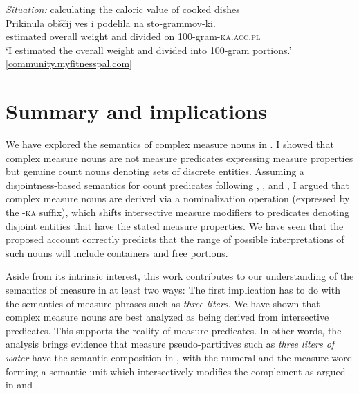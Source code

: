 \documentclass[output=paper]{langscibook}
\begin{document}
\ea\label{ex:khrizmann:40} \textit{Situation:} calculating the caloric value of cooked dishes\\
\gll Prikinula obščij ves i podelila na sto-grammov-ki.\\
estimated overall weight and divided on 100-gram-\textsc{ka.acc.pl}\\
\glt `I estimated the overall weight and divided into 100-gram portions.'\\
\glt \hfill [\href{https://community.myfitnesspal.com/ru/discussion/1469795/pomogite-s-podschetami-kaloriynosti-gotovogo-blyuda}{community.myfitnesspal.com}]
\z

%
%

\section{Summary and implications}\label{sec:6}

We have explored the semantics of complex measure nouns in . I showed that complex measure nouns are not measure predicates expressing measure properties but genuine count nouns denoting sets of discrete entities. Assuming a disjointness-based semantics for count predicates following \citet{Rothstein2010,Rothstein2011}, \citet{Rothstein2017}, and \citet{Landman2011,Landman2016}, I argued that complex measure nouns are derived via a nominalization operation (expressed by the -\textsc{ka} suffix), which shifts intersective measure modifiers to predicates denoting disjoint entities that have the stated measure properties. We have seen that the proposed account correctly predicts that the range of possible interpretations of such nouns will include containers and free portions.

Aside from its intrinsic interest, this work contributes to our understanding of the semantics of measure in at least two ways: The first implication has to do with the semantics of measure phrases such as \textit{three liters}. We have shown that complex measure nouns are best analyzed as being derived from intersective predicates. This supports the reality of measure predicates. In other words, the analysis brings evidence that measure pseudo-partitives such as \textit{three liters of water} have the semantic composition in , with the numeral and the measure word forming a semantic unit which intersectively modifies the complement as argued in \citet{Rothstein2009,Rothstein2011,Rothstein2017} and \citet{Landman2004,Landman2016}.
\end{document}
